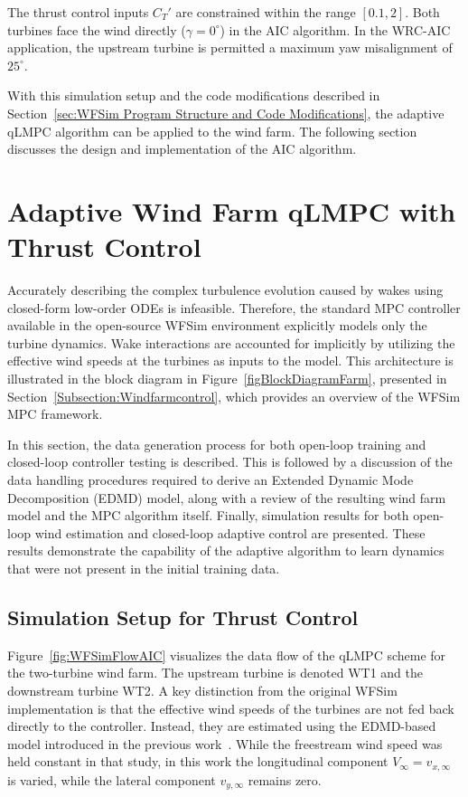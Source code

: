 The thrust control inputs $C_T'$ are constrained within the range $[0.1, 2]$.  Both turbines face the wind directly ($\gamma = 0^{\circ}$) in the AIC algorithm. In the WRC-AIC application, the upstream turbine is permitted a maximum yaw misalignment of $25^{\circ}$.

With this simulation setup and the code modifications described in Section~\ref{sec:WFSim Program Structure and Code Modifications}, the adaptive qLMPC algorithm can be applied to the wind farm. The following section discusses the design and implementation of the AIC algorithm.

\section{Adaptive Wind Farm qLMPC with Thrust Control} \label{sec:AdaptiveWindFarmqLMPCforAIC}
Accurately describing the complex turbulence evolution caused by wakes using closed-form low-order ODEs is infeasible. Therefore, the standard MPC controller available in the open-source WFSim environment explicitly models only the turbine dynamics. Wake interactions are accounted for implicitly by utilizing the effective wind speeds at the turbines as inputs to the model. This architecture is illustrated in the block diagram in Figure~\ref{figBlockDiagramFarm}, presented in Section~\ref{Subsection:Windfarmcontrol}, which provides an overview of the WFSim MPC framework.

In this section, the data generation process for both open-loop training and closed-loop controller testing is described. This is followed by a discussion of the data handling procedures required to derive an Extended Dynamic Mode Decomposition (EDMD) model, along with a review of the resulting wind farm model and the MPC algorithm itself. Finally, simulation results for both open-loop wind estimation and closed-loop adaptive control are presented. These results demonstrate the capability of the adaptive algorithm to learn dynamics that were not present in the initial training data.

\subsection{Simulation Setup for Thrust Control}
Figure~\ref{fig:WFSimFlowAIC} visualizes the data flow of the qLMPC scheme for the two-turbine wind farm. The upstream turbine is denoted WT1 and the downstream turbine WT2. A key distinction from the original WFSim implementation is that the effective wind speeds of the turbines are not fed back directly to the controller. Instead, they are estimated using the EDMD-based model introduced in the previous work~\cite{sharan2022Koopman}. While the freestream wind speed was held constant in that study, in this work the longitudinal component $V_\infty = v_{x,\infty}$ is varied, while the lateral component $v_{y,\infty}$ remains zero.

